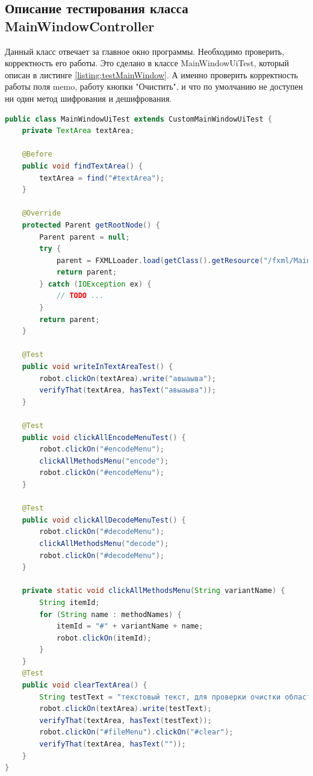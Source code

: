 \documentclass[a4paper,12pt]{article}
\begin{document}
\subsection{Описание тестирования класса MainWindowController}
Данный класс отвечает за главное окно программы. Необходимо проверить, корректность его работы. Это сделано в классе MainWindowUiTest, который описан в листинге \ref{listing:testMainWindow}. А именно проверить корректность работы поля memo, работу кнопки "Очистить", и что по умолчанию не доступен ни один метод шифрования и дешифрования.

\begin{lstlisting}[language=java, caption=тестирование MainWindow, label=listing:testMainWindow]
public class MainWindowUiTest extends CustomMainWindowUiTest {
    private TextArea textArea;

    @Before
    public void findTextArea() {
        textArea = find("#textArea");
    }

    @Override
    protected Parent getRootNode() {
        Parent parent = null;
        try {
            parent = FXMLLoader.load(getClass().getResource("/fxml/MainWindow.fxml"));
            return parent;
        } catch (IOException ex) {
            // TODO ...
        }
        return parent;
    }

    @Test
    public void writeInTextAreaTest() {
        robot.clickOn(textArea).write("авыаыва");
        verifyThat(textArea, hasText("авыаыва"));
    }

    @Test
    public void clickAllEncodeMenuTest() {
        robot.clickOn("#encodeMenu");
        clickAllMethodsMenu("encode");
        robot.clickOn("#encodeMenu");
    }

    @Test
    public void clickAllDecodeMenuTest() {
        robot.clickOn("#decodeMenu");
        clickAllMethodsMenu("decode");
        robot.clickOn("#decodeMenu");
    }

    private static void clickAllMethodsMenu(String variantName) {
        String itemId;
        for (String name : methodNames) {
            itemId = "#" + variantName + name;
            robot.clickOn(itemId);
        }
    }
    @Test
    public void clearTextArea() {
        String testText = "текстовый текст, для проверки очистки области ввода текста";
        robot.clickOn(textArea).write(testText);
        verifyThat(textArea, hasText(testText));
        robot.clickOn("#fileMenu").clickOn("#clear");
        verifyThat(textArea, hasText(""));
    }
}
\end{lstlisting}
\end{document}
